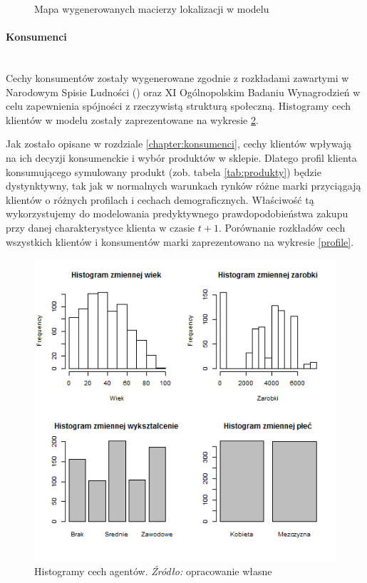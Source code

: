 \documentclass[polish, twoside, 12pt, a4paper]{article}
\theoremstyle{definition}
\theoremstyle{plain}
\theoremstyle{remark}
\begin{document}
\begin{figure}[hbt]
  \captionsetup{margin=10pt,font=small,labelfont=bf,width=.8\textwidth}

  \caption[Krótka nazwa II]{Mapa wygenerowanych macierzy lokalizacji w modelu}\label{fig:xxx}
\end{figure}

\paragraph{Konsumenci}\mbox{}\\
Cechy konsumentów zostały wygenerowane zgodnie z rozkładami zawartymi w Narodowym Spisie Ludności (\cite{GUS2011}) oraz XI Ogólnopolskim Badaniu Wynagrodzień \cite{Sedlak2013} w celu zapewnienia spójności z rzeczywistą strukturą społeczną. Histogramy cech klientów w modelu zostały zaprezentowane na wykresie \ref{ludnosc}. 

Jak zostało opisane w rozdziale \ref{chapter:konsumenci}, cechy klientów wpływają na ich decyzji konsumenckie i wybór produktów w sklepie. Dlatego profil klienta konsumującego symulowany produkt (zob. tabela \ref{tab:produkty}) będzie dystynktywny, tak jak w normalnych warunkach rynków różne marki przyciągają klientów o różnych profilach i cechach demograficznych. Właściwość tą wykorzystujemy do modelowania predyktywnego prawdopodobieństwa zakupu przy danej charakterystyce klienta w czasie $t+1$. Porównanie rozkładów cech wszystkich klientów i konsumentów marki zaprezentowano na wykresie \ref{profile}.

\begin{figure}[hbt]
  \centering
    \includegraphics[width=\textwidth]{pictures/ludnosc.png}
  \captionsetup{margin=10pt,font=small,labelfont=bf,width=.8\textwidth}
  \caption[Histogramy cech agentów]{Histogramy cech agentów. \textit{Źródło:} opracowanie własne}\label{ludnosc}
\end{figure}
\end{document}
